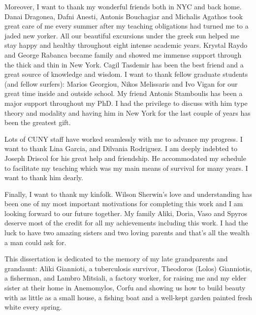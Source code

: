 Moreover, I want to thank my wonderful friends both in NYC and back home. Danai Dragonea, Dafni Anesti, Antonis Bouchagiar 
and Michalis Agathos took great care of me every summer after my teaching obligations
had turned me to a jaded new yorker. All our beautiful excursions under the
greek sun helped me stay happy and healthy throughout eight intense academic years.
Krystal Raydo and George Rabanca became family  and showed me immense support
through the thick and thin in New York. 
Cagil Tasdemir has been the best friend and a great source of knowledge and wisdom.
I want to thank fellow graduate students (and fellow surfers): Marios Georgiou,
Nikos Melissaris and Ivo Vigan for our great time inside and outside school.
My friend Antonis Stamboulis has been a major support throughout my PhD. 
I had the privilege to discuss with him type theory and modality and having 
him in New York for the last couple of years has been 
the greatest gift. 

Lots of  CUNY staff have worked seamlessly with me to advance my progress.
I want to thank Lina Garcia, and Dilvania Rodriguez. I am deeply indebted to Joseph Driscol 
for his great help and friendship. He accommodated  my schedule to facilitate my teaching which was 
my main means of survival for many years.  I want to thank him dearly.


Finally, I want to thank my kinfolk. Wilson Sherwin's love and understanding has been one of my
most important motivations for completing this work and I am looking forward to our future together.
My family Aliki, Doria, Vaso and Spyros deserve most of the credit for all my achievements including
this work. I had the luck to have two amazing sisters and two loving parents and that's all the wealth 
a man could ask for. 

This dissertation is dedicated to the memory of my late grandparents and grandaunt: 
Aliki Giannioti, a tuberculosis survivor, Theodoros (Lolos) Gianniotis, a fisherman, and
Lambro Mitsiali, a factory  worker, for raising me and my elder sister 
at their home in Anemomylos, Corfu and showing us how to build beauty with as little as
a small house, a fishing boat and a well-kept garden painted fresh white every 
spring.